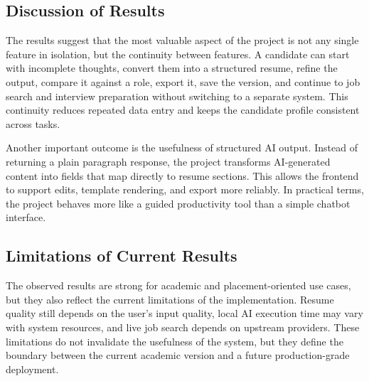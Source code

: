 \subsection{Discussion of Results}
\noindent The results suggest that the most valuable aspect of the project is not any single feature in isolation, but the continuity between features. A candidate can start with incomplete thoughts, convert them into a structured resume, refine the output, compare it against a role, export it, save the version, and continue to job search and interview preparation without switching to a separate system. This continuity reduces repeated data entry and keeps the candidate profile consistent across tasks.

\noindent Another important outcome is the usefulness of structured AI output. Instead of returning a plain paragraph response, the project transforms AI-generated content into fields that map directly to resume sections. This allows the frontend to support edits, template rendering, and export more reliably. In practical terms, the project behaves more like a guided productivity tool than a simple chatbot interface.

\subsection{Limitations of Current Results}
\noindent The observed results are strong for academic and placement-oriented use cases, but they also reflect the current limitations of the implementation. Resume quality still depends on the user’s input quality, local AI execution time may vary with system resources, and live job search depends on upstream providers. These limitations do not invalidate the usefulness of the system, but they define the boundary between the current academic version and a future production-grade deployment.
